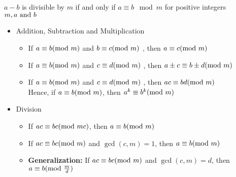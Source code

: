 
\begin{mysubsection}{}
    \begin{definition}[def:]{}
        $a-b$ is divisible by $m$ if and only if $a\equiv b \mod m$ \qquad for positive integers $m, a \textnormal{ and }b$
    \end{definition}
    \begin{itemize}
        \item Addition, Subtraction and Multiplication
            \begin{itemize}
                \item If $a\equiv b (\textnormal{mod  }m)$ and  $b\equiv c (\textnormal{mod  }m)$ , then  $a\equiv c (\textnormal{mod  }m)$
                \item If $a\equiv b (\textnormal{mod  }m)$ and  $c\equiv d (\textnormal{mod  }m)$ , then  $a\pm c\equiv b \pm d (\textnormal{mod  }m)$
                \item If $a\equiv b (\textnormal{mod  }m)$ and  $c\equiv d (\textnormal{mod  }m)$ , then  $ac\equiv bd (\textnormal{mod  }m)$ \\
                    Hence, if $a\equiv b(\textnormal{mod }m)$, then $a^k\equiv b^k (\textnormal{mod }m)$
            \end{itemize}
        \item Division
            \begin{itemize}
                \item If $ac\equiv bc(\textnormal{mod }mc)$, then $a\equiv b (\textnormal{mod }m)$
                \item If $ac\equiv bc(\textnormal{mod }m)$ and $\gcd(c,m)=1$, then $a\equiv b (\textnormal{mod }m)$
                \item \textbf{Generalization: }If $ac\equiv bc(\textnormal{mod }m)$ and $\gcd(c,m)=d$, then $a\equiv b (\textnormal{mod }\frac{m}{d})$
            \end{itemize}
    \end{itemize}
\end{mysubsection}

\mynewpage
\begin{shortque}[]{}


\end{shortque}

